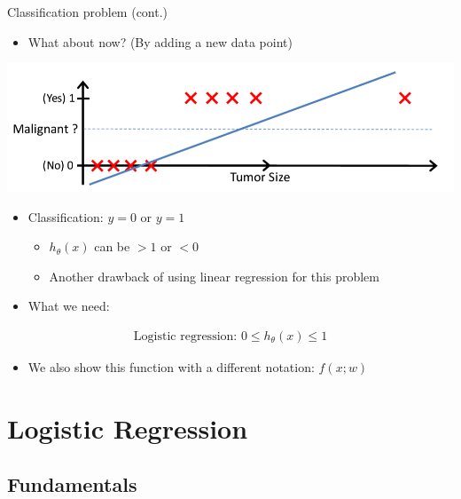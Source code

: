 \documentclass[serif, aspectratio=169]{beamer}
\begin{document}
\begin{frame}{Classification problem (cont.)}
    \begin{itemize}
        \item What about now? (By adding a new data point)
    \end{itemize}
    
    \centering
    \includegraphics[width=0.68\linewidth]{pic/lrClassification2.png}
    
    \begin{itemize}
        \item Classification: $y=0$ or $y=1$
            \begin{itemize}
                \item $h_ \theta(x)$ can be $>1$ or $<0$
                \item Another drawback of using linear regression for this problem
            \end{itemize}
        \item What we need:
    \end{itemize}
    \begin{align*}
        \text{Logistic regression:  } 0 \leq h_\theta (x) \leq 1
    \end{align*}
    \begin{itemize}
        \item We also show this function with a different notation: $f(x;w)$
    \end{itemize}
\end{frame}



\section{Logistic Regression}

\subsection{Fundamentals}
\end{document}
